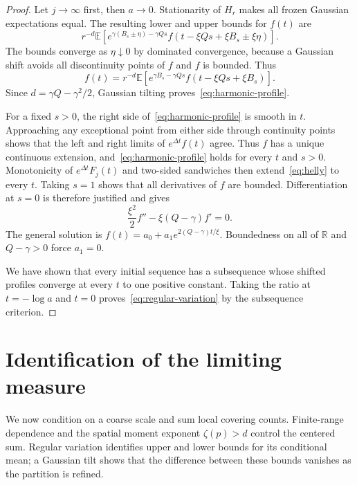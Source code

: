 \documentclass[11pt,letterpaper]{article}
\newcommand{\R}{\mathbb R}
\newcommand{\E}{\mathbb E}
\theoremstyle{definition}
\theoremstyle{remark}
\numberwithin{equation}{section}
\begin{document}
\begin{proof}
Let $j\to\infty$ first, then $a\to0$. Stationarity of $H_r$ makes all frozen Gaussian expectations equal. The resulting lower and upper bounds for $f(t)$ are
\begin{equation*}
 r^{-d}\E\!\left[
  e^{\gamma(B_s\pm\eta)-\gamma Qs}
  f(t-\xi Qs+\xi B_s\pm\xi\eta)\right].
\end{equation*}
The bounds converge as $\eta\downarrow0$ by dominated convergence, because a Gaussian shift avoids all discontinuity points of $f$ and $f$ is bounded. Thus
\begin{equation*}
 f(t)=r^{-d}\E\!\left[
       e^{\gamma B_s-\gamma Qs}
       f(t-\xi Qs+\xi B_s)\right].
\end{equation*}
Since $d=\gamma Q-\gamma^2/2$, Gaussian tilting proves~\eqref{eq:harmonic-profile}.

For a fixed $s>0$, the right side of~\eqref{eq:harmonic-profile} is smooth in $t$. Approaching any exceptional point from either side through continuity points shows that the left and right limits of $e^{\Delta t}f(t)$ agree. Thus $f$ has a unique continuous extension, and~\eqref{eq:harmonic-profile} holds for every $t$ and $s>0$. Monotonicity of $e^{\Delta t}F_j(t)$ and two-sided sandwiches then extend~\eqref{eq:helly} to every $t$. Taking $s=1$ shows that all derivatives of $f$ are bounded. Differentiation at $s=0$ is therefore justified and gives
\begin{equation*}
 \frac{\xi^2}{2}f''-\xi(Q-\gamma)f'=0.
\end{equation*}
The general solution is $f(t)=a_0+a_1e^{2(Q-\gamma)t/\xi}$. Boundedness on all of $\R$ and $Q-\gamma>0$ force $a_1=0$.

We have shown that every initial sequence has a subsequence whose shifted profiles converge at every $t$ to one positive constant. Taking the ratio at $t=-\log a$ and $t=0$ proves~\eqref{eq:regular-variation} by the subsequence criterion.
\end{proof}

\section{Identification of the limiting measure}

We now condition on a coarse scale and sum local covering counts. Finite-range dependence and the spatial moment exponent $\zeta(p)>d$ control the centered sum. Regular variation identifies upper and lower bounds for its conditional mean; a Gaussian tilt shows that the difference between these bounds vanishes as the partition is refined.
\end{document}
